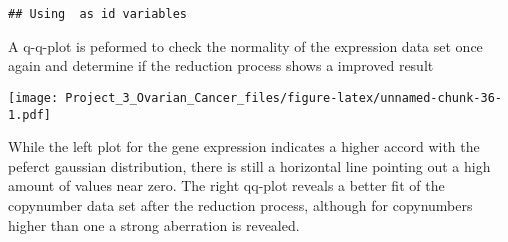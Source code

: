 \documentclass[]{article}
\newenvironment{Shaded}{\begin{snugshade}}{\end{snugshade}}
\newcommand{\CommentTok}[1]{\textcolor[rgb]{0.56,0.35,0.01}{\textit{#1}}}
\newcommand{\DataTypeTok}[1]{\textcolor[rgb]{0.13,0.29,0.53}{#1}}
\newcommand{\DecValTok}[1]{\textcolor[rgb]{0.00,0.00,0.81}{#1}}
\newcommand{\KeywordTok}[1]{\textcolor[rgb]{0.13,0.29,0.53}{\textbf{#1}}}
\newcommand{\NormalTok}[1]{#1}
\newcommand{\OperatorTok}[1]{\textcolor[rgb]{0.81,0.36,0.00}{\textbf{#1}}}
\newcommand{\StringTok}[1]{\textcolor[rgb]{0.31,0.60,0.02}{#1}}
\begin{document}
\begin{Shaded}
\end{Shaded}

\begin{verbatim}
## Using  as id variables
\end{verbatim}

A q-q-plot is peformed to check the normality of the expression data set
once again and determine if the reduction process shows a improved
result

\begin{Shaded}
\end{Shaded}

\texttt{[image: Project\_3\_Ovarian\_Cancer\_files/figure-latex/unnamed-chunk-36-1.pdf]}

While the left plot for the gene expression indicates a higher accord
with the peferct gaussian distribution, there is still a horizontal line
pointing out a high amount of values near zero. The right qq-plot
reveals a better fit of the copynumber data set after the reduction
process, although for copynumbers higher than one a strong aberration is
revealed.
\end{document}
